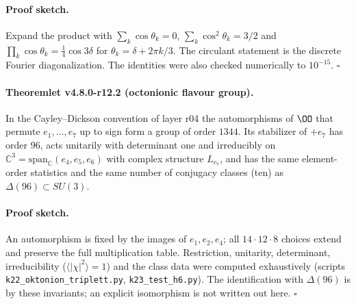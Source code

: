 \paragraph{Proof sketch.}
Expand the product with \(\sum_k\cos\theta_k=0\), \(\sum_k\cos^2\theta_k=3/2\) and
\(\prod_k\cos\theta_k=\tfrac14\cos3\delta\) for \(\theta_k=\delta+2\pi k/3\).  The circulant statement is the
discrete Fourier diagonalization.  The identities were also checked numerically to \(10^{-15}\).  \(\square\)

\paragraph{Theoremlet v4.8.0-r12.2 (octonionic flavour group).}
In the Cayley--Dickson convention of layer r04 the automorphisms of \(\OO\) that permute
\(e_1,\dots,e_7\) up to sign form a group of order \(1344\).  Its stabilizer of \(+e_7\) has order \(96\),
acts unitarily with determinant one and irreducibly on \(\mathbb C^3=\mathrm{span}_{\mathbb C}(e_4,e_5,e_6)\)
with complex structure \(L_{e_7}\), and has the same element-order statistics and the same number of
conjugacy classes (ten) as \(\Delta(96)\subset SU(3)\).

\paragraph{Proof sketch.}
An automorphism is fixed by the images of \(e_1,e_2,e_4\); all \(14\cdot12\cdot8\) choices extend and
preserve the full multiplication table.  Restriction, unitarity, determinant, irreducibility
(\(\langle|\chi|^2\rangle=1\)) and the class data were computed exhaustively (scripts
\texttt{k22\_oktonion\_triplett.py}, \texttt{k23\_test\_h6.py}).  The identification with \(\Delta(96)\) is by
these invariants; an explicit isomorphism is not written out here.  \(\square\)

